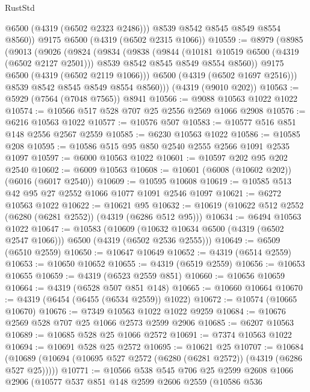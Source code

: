 \begin{lexlean}{RustStd}
\begin{coremodule}
          @6500
          (@4319 (@6502 @2323 @2486)))
        @8539
        @8542
        @8545
        @8549
        @8554
        @8560))
    @9175
    @6500
    (@4319 (@6502 @2315 @1066))
@10559 := @8979
    (@8985
      (@9013
        (@9026
          (@9824
            (@9834
              (@9838
                (@9844
                  (@10181 @10519 @6500 (@4319 (@6502 @2127 @2501)))
                  @8539
                  @8542
                  @8545
                  @8549
                  @8554
                  @8560))
              @9175
              @6500
              (@4319 (@6502 @2119 @1066)))
            @6500
            (@4319 (@6502 @1697 @2516)))
          @8539
          @8542
          @8545
          @8549
          @8554
          @8560)))
    (@4319 (@9010 @202))
@10563 := @5929 (@7564 (@7048 @7565)) @8941
@10566 := @9088 @10563 @1022 @1022
@10574 := @10566 @517 @528 @707 @25 @2556 @2569 @1066 @2908
@10576 := @6216 @10563 @1022
@10577 := @10576 @507
@10583 := @10577 @516 @851 @148 @2556 @2567 @2559
@10585 := @6230 @10563 @1022
@10586 := @10585 @208
@10595 := @10586 @515 @95 @850 @2540 @2555 @2566 @1091 @2535 @1097
@10597 := @6000 @10563 @1022
@10601 := @10597 @202 @95 @202 @2540
@10602 := @6009 @10563
@10608 := @10601 (@6008 (@10602 @202)) (@6016 (@6017 @2540))
@10609 := @10595 @10608
@10619 := @10585 @513 @42 @95 @27 @2552 @1066 @1077 @1091 @2546 @1097
@10621 := @6272 @10563 @1022
@10622 := @10621 @95
@10632 := @10619 (@10622 @512 @2552 (@6280 (@6281 @2552)) (@4319 (@6286 @512 @95)))
@10634 := @6494 @10563 @1022
@10647 := @10583
    (@10609 (@10632 @10634 @6500 (@4319 (@6502 @2547 @1066))) @6500 (@4319 (@6502 @2536 @2555)))
@10649 := @6509 (@6510 @2559)
@10650 := @10647 @10649
@10652 := @4319 (@6514 @2559)
@10653 := @10650 @10652
@10655 := @4319 (@6519 @2559)
@10656 := @10653 @10655
@10659 := @4319 (@6523 @2559 @851)
@10660 := @10656 @10659
@10664 := @4319 (@6528 @507 @851 @148)
@10665 := @10660 @10664
@10670 := @4319 (@6454 (@6455 (@6534 @2559)) @1022)
@10672 := @10574 (@10665 @10670)
@10676 := @7349 @10563 @1022 @1022 @9259
@10684 := @10676 @2569 @528 @707 @25 @1066 @2573 @2599 @2906
@10685 := @6207 @10563
@10689 := @10685 @528 @25 @1066 @2572
@10691 := @7374 @10563 @1022
@10694 := @10691 @528 @25 @2572
@10695 := @10621 @25
@10707 := @10684
    (@10689 (@10694 (@10695 @527 @2572 (@6280 (@6281 @2572)) (@4319 (@6286 @527 @25)))))
@10771 := @10566
    @538
    @545
    @706
    @25
    @2599
    @2608
    @1066
    @2906
    (@10577
      @537
      @851
      @148
      @2599
      @2606
      @2559
      (@10586
        @536

\end{coremodule}
\end{lexlean}
